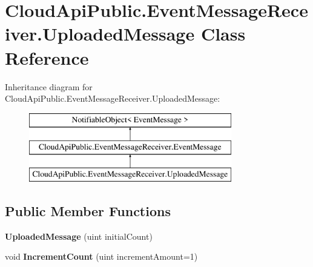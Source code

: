 \hypertarget{class_cloud_api_public_1_1_event_message_receiver_1_1_uploaded_message}{\section{Cloud\-Api\-Public.\-Event\-Message\-Receiver.\-Uploaded\-Message Class Reference}
\label{class_cloud_api_public_1_1_event_message_receiver_1_1_uploaded_message}
}
Inheritance diagram for Cloud\-Api\-Public.\-Event\-Message\-Receiver.\-Uploaded\-Message\-:\begin{figure}[H]
\begin{center}
\leavevmode
\includegraphics[height=3.000000cm]{class_cloud_api_public_1_1_event_message_receiver_1_1_uploaded_message}
\end{center}
\end{figure}
\subsection*{Public Member Functions}
\begin{DoxyCompactItemize}
\item 
\hypertarget{class_cloud_api_public_1_1_event_message_receiver_1_1_uploaded_message_ab724382c27f03c08f3709c2833a3ca36}{{\bfseries Uploaded\-Message} (uint initial\-Count)}\label{class_cloud_api_public_1_1_event_message_receiver_1_1_uploaded_message_ab724382c27f03c08f3709c2833a3ca36}

\item 
\hypertarget{class_cloud_api_public_1_1_event_message_receiver_1_1_uploaded_message_a0e360962249aa9c82950d7f13ba763b0}{void {\bfseries Increment\-Count} (uint increment\-Amount=1)}\label{class_cloud_api_public_1_1_event_message_receiver_1_1_uploaded_message_a0e360962249aa9c82950d7f13ba763b0}

\end{DoxyCompactItemize}

